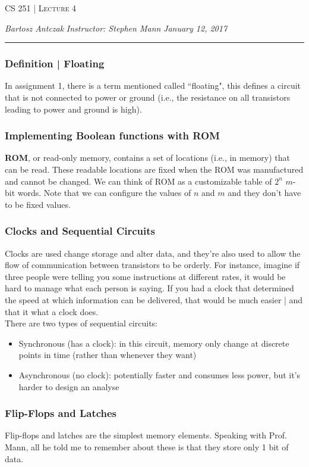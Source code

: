 \documentclass{report}
\newcommand{\lectureNum}{4}
\newcommand{\curDate}{January 12, 2017}
\newcommand{\course}{CS 251}
\newcommand{\instructor}{Stephen Mann}
\begin{document}
\begin{center}
\begin{Large}
\textsc{\course{} | Lecture \lectureNum{}}
\end{Large}
\end{center} 
\noindent \textit{Bartosz Antczak} \hfill
\textit{Instructor: \instructor{}} \hfill
\textit{\curDate{}}
\rule{\textwidth}{0.4pt}
\subsubsection{Definition | Floating}
In assignment 1, there is a term mentioned called ``floating", this defines a circuit that is not connected to power or ground (i.e., the resistance on all transistors leading to power and ground is high).
\subsubsection{Implementing Boolean functions with ROM}
\textbf{ROM}, or read-only memory, contains a set of locations (i.e., in memory) that can be read. These readable locations are fixed when the ROM was manufactured and cannot be changed. We can think of ROM as a customizable table of $2^n$ $m$-bit words. Note that we can configure the values of $n$ and $m$ and they don't have to be fixed values.
\subsubsection{Clocks and Sequential Circuits}
Clocks are used change storage and alter data, and they're also used to allow the flow of communication between transistors to be orderly. For instance, imagine if three people were telling you some instructions at different rates, it would be hard to manage what each person is saying. If you had a clock that determined the speed at which information can be delivered, that would be much easier | and that it what a clock does.\\
There are two types of sequential circuits:
\begin{itemize}
\item Synchronous (has a clock): in this circuit, memory only change at discrete points in time (rather than whenever they want)
\item Asynchronous (no clock): potentially faster and consumes less power, but it's harder to design an analyse
\end{itemize}
\subsubsection{Flip-Flops and Latches}
Flip-flops and latches are the simplest memory elements. Speaking with Prof. Mann, all he told me to remember about these is that they store only 1 bit of data.
\end{document}
